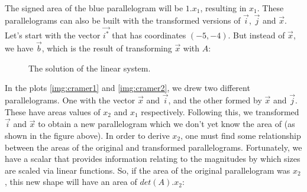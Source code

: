 \documentclass[600paper, 11pt,twoside,openany]{kdp}
\begin{document}
\newpage
\indent The signed area of the blue parallelogram will be $1.x_1$, resulting in $x_1$. These parallelograms can also be built with the transformed versions of $\overrightarrow{i}$, $\overrightarrow{j}$ and $\overrightarrow{x}$. Let’s start with the vector $\overrightarrow{i^*}$ that has coordinates $(−5,−4)$. But instead of $\overrightarrow{x}$, we have $\overrightarrow{b}$, which is the result of transforming $\overrightarrow{x}$ with $A$:
\begin{figure}[h!]
\begin{center}
\end{center}
\caption{The solution of the linear system.}
\end{figure}
\par 
\vspace{-3pt}
\indent In the plots \ref{img:cramer1} and \ref{img:cramer2}, we drew two different parallelograms. One with the vector $\overrightarrow{x}$ and $\overrightarrow{i}$, and the other formed by $\overrightarrow{x}$ and $\overrightarrow{j}$. These have areas values of $x_2$ and $x_1$ respectively. Following this, we transformed $\overrightarrow{i}$ and $\overrightarrow{x}$ to obtain a new parallelogram which we don’t yet know the area of (as shown in the figure above). In order to derive $x_2$, one must find some relationship between the areas of the original and transformed parallelograms. Fortunately, we have a scalar that provides information relating to the magnitudes by which sizes are scaled via linear functions. So, if the area of the original parallelogram was $x_2$, this new shape will have an area of $det(A).x_2$:
\end{document}
